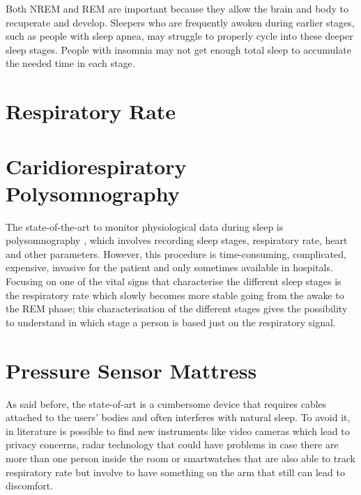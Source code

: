 Both NREM and REM are important because they allow the brain and body to recuperate and develop. Sleepers who are frequently awoken during earlier stages, such as people with sleep apnea, may struggle to properly cycle into these deeper sleep stages. People with insomnia may not get enough total sleep to accumulate the needed time in each stage.

\section{Respiratory Rate}



































\newpage
\section{Caridiorespiratory Polysomnography}

The state-of-the-art to monitor physiological data during sleep is polysomnography \cite{Penzel2016ModulationsPolysomnography}
, which involves recording sleep stages, respiratory rate, heart and other parameters. However, this procedure is time-consuming, 
complicated, expensive, invasive for the patient and only sometimes available in hospitals. 
Focusing on one of the vital signs that characterise the different sleep stages is the respiratory rate 
which slowly becomes more stable going from the awake to the REM phase; this characterisation of the different stages gives the possibility to 
understand in which stage a person is based just on the respiratory signal.


\section{Pressure Sensor Mattress}

As said before, the state-of-art is a cumbersome device that requires cables attached to the users' bodies and often interferes with natural sleep. To avoid it, in literature is possible to find new instruments like video cameras which lead to privacy concerns, radar technology that could have problems in case there are more than one person inside the room or smartwatches that are also able to track respiratory rate but involve to have something on the arm that still can lead to discomfort.

